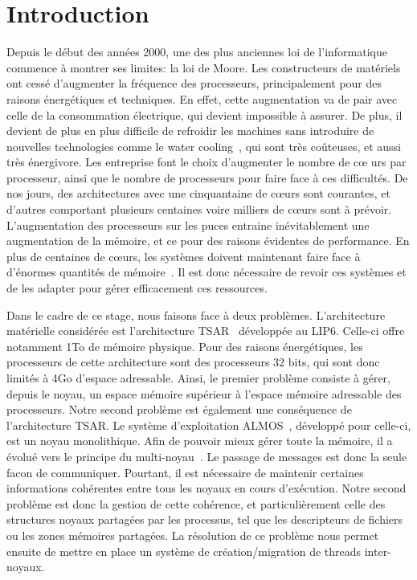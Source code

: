 \chapter{Introduction}

  \hspace{1cm}Depuis le début des années 2000, une des plus anciennes loi de
  l'informatique commence à montrer ses limites: la loi de Moore. Les
  constructeurs de matériels ont cessé d'augmenter la fréquence des processeurs,
  principalement pour des raisons énergétiques et techniques. En effet, cette
  augmentation va de pair avec celle de la consommation électrique, qui devient
  impossible à assurer. De plus, il devient de plus en plus difficile de
  refroidir les machines sans introduire de nouvelles technologies comme le
  water cooling~\citep{googleXXXXdatacenters}, qui sont très coûteuses, et aussi
  très énergivore. Les entreprise font le choix d'augmenter le nombre de c\oe
  urs par processeur, ainsi que le nombre de processeurs pour faire face à ces
  difficultés. De nos jours, des architectures avec une cinquantaine de c\oe urs
  sont courantes, et d'autres comportant plusieurs centaines voire milliers de
  c\oe urs sont à prévoir. L'augmentation des processeurs sur les puces entraine
  inévitablement une augmentation de la mémoire, et ce pour des raisons
  évidentes de performance. En plus de centaines de c\oe urs, les systèmes
  doivent maintenant faire face à d'énormes quantités de
  mémoire~\citep{hp2012z820, puget2013z9pe}. Il est donc nécessaire de revoir
  ces systèmes et de les adapter pour gérer efficacement ces ressources.\newline
  
  \hspace{1cm}Dans le cadre de ce stage, nous faisons face à deux
  problèmes. L'architecture matérielle considérée est l'architecture
  TSAR~\citep{greiner2009tsar} développée au LIP6. Celle-ci offre notamment 1To
  de mémoire physique. Pour des raisons énergétiques, les processeurs de cette
  architecture sont des processeurs 32 bits, qui sont donc limités à 4Go
  d'espace adressable. Ainsi, le premier problème consiste à gérer, depuis le
  noyau, un espace mémoire supérieur à l'espace mémoire adressable des
  processeurs. Notre second problème est également une conséquence de
  l'architecture TSAR. Le système d'exploitation
  ALMOS~\citep{almaless2011almos}, développé pour celle-ci, est un noyau
  monolithique. Afin de pouvoir mieux gérer toute la mémoire, il a évolué vers
  le principe du multi-noyau~\cite{schupbach2008embracing}. Le passage de
  messages est donc la seule facon de communiquer. Pourtant, il est nécessaire
  de maintenir certaines informations cohérentes entre tous les noyaux en cours
  d'exécution. Notre second problème est donc la gestion de cette cohérence, et
  particulièrement celle des structures noyaux partagées par les processus, tel
  que les descripteurs de fichiers ou les zones mémoires partagées. La
  résolution de ce problème nous permet ensuite de mettre en place un système de
  création/migration de threads inter-noyaux.\newline

